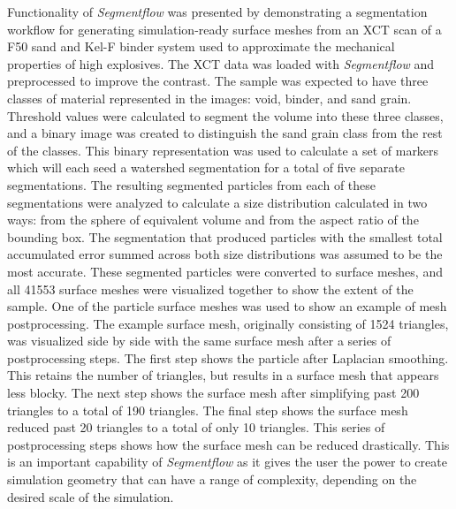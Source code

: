 Functionality of \textit{Segmentflow} was presented by demonstrating a
segmentation workflow for generating simulation-ready surface meshes from
an XCT scan of a F50 sand and Kel-F binder system used to approximate the
mechanical properties of high explosives. The XCT data was
loaded with \textit{Segmentflow} and preprocessed to improve the contrast.
The sample was expected to have three classes of material represented
in the images: void, binder, and sand grain. Threshold values were calculated
to segment the volume into these three classes, and a binary image was
created to distinguish the sand grain class from the rest of the classes.
This binary representation was used to calculate a set of markers which will
each seed a watershed segmentation for a total of five separate
segmentations. The resulting
segmented particles from each of these segmentations were analyzed to
calculate a size distribution calculated in two ways: from the sphere
of equivalent volume and from the aspect ratio of the bounding box. The
segmentation that produced particles with the smallest total accumulated
error summed across both size distributions was assumed to be the most
accurate. These segmented particles were converted to surface meshes, and
all 41553 surface meshes were visualized together to show the extent of the
sample. One of the particle surface meshes was used to show an example of mesh
postprocessing. The example surface mesh, originally consisting of 1524
triangles, was visualized side by side with the same surface mesh after
a series of postprocessing steps. The first step shows the particle after
Laplacian smoothing. This retains the number of triangles, but results in
a surface mesh that appears less blocky. The next step shows the surface
mesh after simplifying past 200 triangles to a total of 190 triangles. The
final step shows the surface mesh reduced past 20 triangles
to a total of only 10 triangles. This series of postprocessing steps
shows how the surface mesh can be reduced drastically. This is an important
capability of \textit{Segmentflow} as it gives the user the power to create
simulation geometry that can have a range of complexity, depending on the
desired scale of the simulation.



